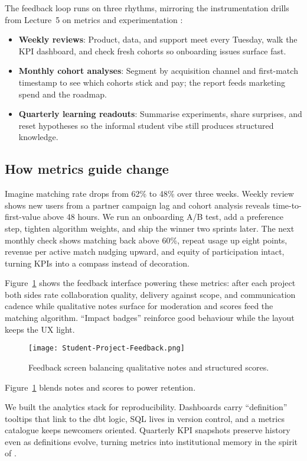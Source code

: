 The feedback loop runs on three rhythms, mirroring the instrumentation drills from Lecture~5 on metrics and experimentation \citep{Lecture05}:
\begin{itemize}
    \item \textbf{Weekly reviews}: Product, data, and support meet every Tuesday, walk the KPI dashboard, and check fresh cohorts so onboarding issues surface fast.
    \item \textbf{Monthly cohort analyses}: Segment by acquisition channel and first-match timestamp to see which cohorts stick and pay; the report feeds marketing spend and the roadmap.
    \item \textbf{Quarterly learning readouts}: Summarise experiments, share surprises, and reset hypotheses so the informal student vibe still produces structured knowledge.
\end{itemize}

\subsection*{How metrics guide change}
Imagine matching rate drops from 62\% to 48\% over three weeks. Weekly review shows new users from a partner campaign lag and cohort analysis reveals time-to-first-value above 48 hours. We run an onboarding A/B test, add a preference step, tighten algorithm weights, and ship the winner two sprints later. The next monthly check shows matching back above 60\%, repeat usage up eight points, revenue per active match nudging upward, and equity of participation intact, turning KPIs into a compass instead of decoration.

Figure~\ref{fig:feedback-screen} shows the feedback interface powering these metrics: after each project both sides rate collaboration quality, delivery against scope, and communication cadence while qualitative notes surface for moderation and scores feed the matching algorithm. ``Impact badges'' reinforce good behaviour while the layout keeps the UX light.

\begin{figure}[H]
  \centering
  \texttt{[image: Student-Project-Feedback.png]}
  \caption{Feedback screen balancing qualitative notes and structured scores.}
  \label{fig:feedback-screen}
\end{figure}

Figure~\ref{fig:feedback-screen} blends notes and scores to power retention.

We built the analytics stack for reproducibility. Dashboards carry ``definition'' tooltips that link to the dbt logic, SQL lives in version control, and a metrics catalogue keeps newcomers oriented. Quarterly KPI snapshots preserve history even as definitions evolve, turning metrics into institutional memory in the spirit of \citet{Choudary2016}.
